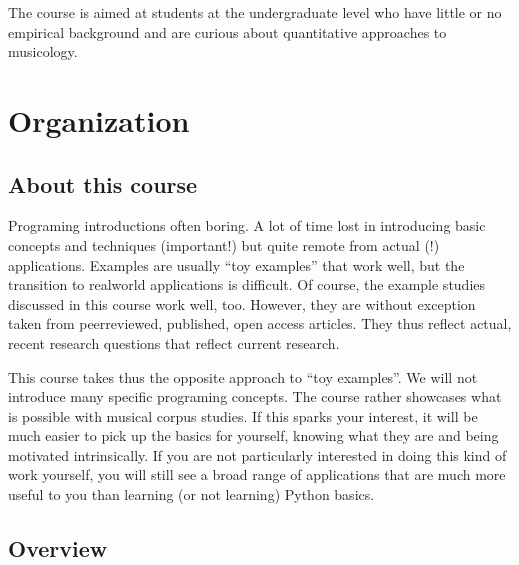 \documentclass[letterpaper,10pt,english]{sphinxmanual}
\begin{document}
The course is aimed at students at the undergraduate level who have little or no empirical background and are curious
about quantitative approaches to musicology.


\chapter{Organization}
\label{\detokenize{1_orga:organization}}\label{\detokenize{1_orga::doc}}

\section{About this course}
\label{\detokenize{1_orga:about-this-course}}
Programing introductions often boring.
A lot of time lost in introducing basic concepts and techniques (important!)
but quite remote from actual (!) applications. Examples are usually “toy examples”
that work well, but the transition to real\sphinxhyphen{}world applications is difficult.
Of course, the example studies discussed in this course work well, too.
However, they are without exception taken from peer\sphinxhyphen{}reviewed, published, open access articles.
They thus reflect actual, recent research questions that reflect current research.

This course takes thus the opposite approach to “toy examples”. We will not introduce many specific
programing concepts. The course rather showcases what is possible with musical corpus studies.
If this sparks your interest, it will be much easier to pick up the basics for yourself,
knowing what they are  and being motivated intrinsically.
If you are not particularly interested in doing this kind of work yourself,
you will still see a broad range of applications that are much more useful to you than
learning (or not learning) Python basics.


\section{Overview}
\label{\detokenize{1_orga:overview}}
\end{document}
